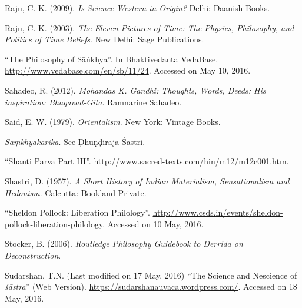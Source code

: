 \begin{thebibliography}{99}
Raju, C. K. (2009). {\sl Is Science Western in Origin?} Delhi: Daanish Books.

Raju, C. K. (2003). {\sl The Eleven Pictures of Time: The Physics, Philosophy, and Politics of Time Beliefs}. New Delhi: Sage Publications.

``The Philosophy of Sāṅkhya''. In Bhaktivedanta VedaBase. \url{http://www.vedabase.com/en/sb/11/24}. Accessed on May 10, 2016.

Sahadeo, R. (2012). {\sl Mohandas K. Gandhi: Thoughts, Words, Deeds: His inspiration: Bhagavad-Gita}. Ramnarine Sahadeo.

Said, E. W. (1979). {\sl Orientalism}. New York: Vintage Books.

{\sl Saṃkhyakarikā}. See Ḍhuṇḍirāja Śāstri.

``Shanti Parva Part III''. \url{http://www.sacred-texts.com/hin/m12/m12c001.htm}. 

Shastri, D. (1957). {\sl A Short History of Indian Materialism, Sensationalism and Hedonism}. Calcutta: Bookland Private.

``Sheldon Pollock: Liberation Philology''. \url{http://www.csds.in/events/sheldon-pollock-liberation-philology}. Accessed on 10 May, 2016.

Stocker, B. (2006). {\sl Routledge Philosophy Guidebook to Derrida on Deconstruction}. 

Sudarshan, T.N. (Last modified on 17 May, 2016) ``The Science and Nescience of {\sl śāstra}'' (Web Version). \url{https://sudarshanauvaca.wordpress.com/}. Accessed on 18 May, 2016.
\end{thebibliography}


\theendnotes
